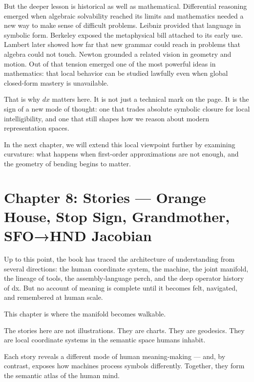 But the deeper lesson is historical as well as mathematical.
Differential reasoning emerged when algebraic solvability reached its
limits and mathematics needed a new way to make sense of difficult
problems. Leibniz provided that language in symbolic form. Berkeley
exposed the metaphysical bill attached to its early use. Lambert later
showed how far that new grammar could reach in problems that algebra
could not touch. Newton grounded a related vision in geometry and
motion. Out of that tension emerged one of the most powerful ideas in
mathematics: that local behavior can be studied lawfully even when
global closed-form mastery is unavailable.

That is why \(dx\) matters here. It is not just a technical mark on the
page. It is the sign of a new mode of thought: one that trades absolute
symbolic closure for local intelligibility, and one that still shapes
how we reason about modern representation spaces.

In the next chapter, we will extend this local viewpoint further by
examining curvature: what happens when first-order approximations are
not enough, and the geometry of bending begins to matter.

\hypertarget{chapter-8-stories-orange-house-stop-sign-grandmother-sfohnd-jacobian}{%
\section{Chapter 8: Stories --- Orange House, Stop Sign, Grandmother,
SFO→HND
Jacobian}\label{chapter-8-stories-orange-house-stop-sign-grandmother-sfohnd-jacobian}}

Up to this point, the book has traced the architecture of understanding
from several directions: the human coordinate system, the machine, the
joint manifold, the lineage of tools, the assembly‑language perch, and
the deep operator history of dx. But no account of meaning is complete
until it becomes felt, navigated, and remembered at human scale.

This chapter is where the manifold becomes walkable.

The stories here are not illustrations. They are charts. They are
geodesics. They are local coordinate systems in the semantic space
humans inhabit.

Each story reveals a different mode of human meaning‑making --- and, by
contrast, exposes how machines process symbols differently. Together,
they form the semantic atlas of the human mind.

